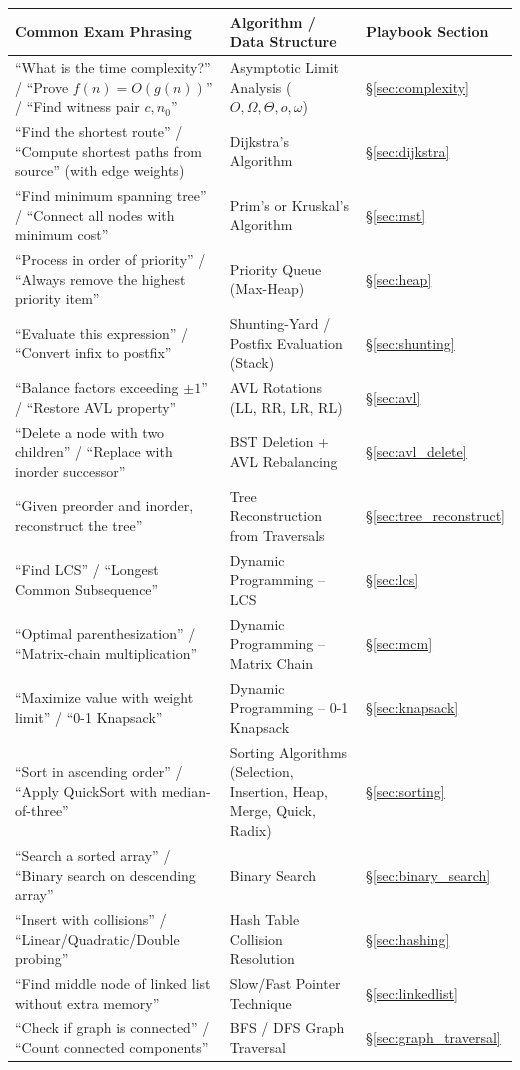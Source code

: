 \documentclass[12pt,portrait]{article}
\begin{document}
{\small
\begin{longtable}{p{4.2cm}|p{4.5cm}|p{4.5cm}}
\toprule
\textbf{Common Exam Phrasing} & \textbf{Algorithm / Data Structure} & \textbf{Playbook Section} \\
\midrule
\endhead
\bottomrule
\endfoot
``What is the time complexity?'' / ``Prove $f(n)=O(g(n))$'' / ``Find witness pair $c, n_0$'' & Asymptotic Limit Analysis ($O, \Omega, \Theta, o, \omega$) & \S\ref{sec:complexity} \\
\midrule
``Find the shortest route'' / ``Compute shortest paths from source'' (with edge weights) & Dijkstra's Algorithm & \S\ref{sec:dijkstra} \\
\midrule
``Find minimum spanning tree'' / ``Connect all nodes with minimum cost'' & Prim's or Kruskal's Algorithm & \S\ref{sec:mst} \\
\midrule
``Process in order of priority'' / ``Always remove the highest priority item'' & Priority Queue (Max-Heap) & \S\ref{sec:heap} \\
\midrule
``Evaluate this expression'' / ``Convert infix to postfix'' & Shunting-Yard / Postfix Evaluation (Stack) & \S\ref{sec:shunting} \\
\midrule
``Balance factors exceeding $\pm 1$'' / ``Restore AVL property'' & AVL Rotations (LL, RR, LR, RL) & \S\ref{sec:avl} \\
\midrule
``Delete a node with two children'' / ``Replace with inorder successor'' & BST Deletion + AVL Rebalancing & \S\ref{sec:avl_delete} \\
\midrule
``Given preorder and inorder, reconstruct the tree'' & Tree Reconstruction from Traversals & \S\ref{sec:tree_reconstruct} \\
\midrule
``Find LCS'' / ``Longest Common Subsequence'' & Dynamic Programming -- LCS & \S\ref{sec:lcs} \\
\midrule
``Optimal parenthesization'' / ``Matrix-chain multiplication'' & Dynamic Programming -- Matrix Chain & \S\ref{sec:mcm} \\
\midrule
``Maximize value with weight limit'' / ``0-1 Knapsack'' & Dynamic Programming -- 0-1 Knapsack & \S\ref{sec:knapsack} \\
\midrule
``Sort in ascending order'' / ``Apply QuickSort with median-of-three'' & Sorting Algorithms (Selection, Insertion, Heap, Merge, Quick, Radix) & \S\ref{sec:sorting} \\
\midrule
``Search a sorted array'' / ``Binary search on descending array'' & Binary Search & \S\ref{sec:binary_search} \\
\midrule
``Insert with collisions'' / ``Linear/Quadratic/Double probing'' & Hash Table Collision Resolution & \S\ref{sec:hashing} \\
\midrule
``Find middle node of linked list without extra memory'' & Slow/Fast Pointer Technique & \S\ref{sec:linkedlist} \\
\midrule
``Check if graph is connected'' / ``Count connected components'' & BFS / DFS Graph Traversal & \S\ref{sec:graph_traversal} \\
\bottomrule
\end{longtable}
}
\end{document}
